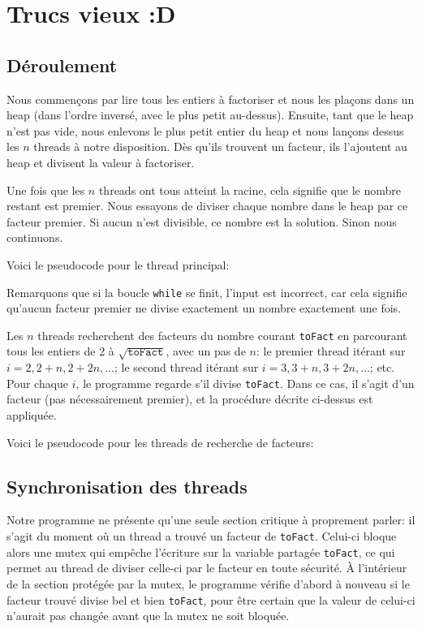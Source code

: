 \documentclass[a4paper,10pt]{article}
\begin{document}
\newpage
\section*{Trucs vieux :D}

\subsection*{Déroulement}

Nous commençons par lire tous les entiers à factoriser et nous les plaçons dans un heap (dans l'ordre inversé, avec le plus petit au-dessus). Ensuite, tant que le heap n'est pas vide, nous enlevons le plus petit entier du heap et nous lançons dessus les $n$ threads à notre disposition. Dès qu'ils trouvent un facteur, ils l'ajoutent au heap et divisent la valeur à factoriser.

Une fois que les $n$ threads ont tous atteint la racine, cela signifie que le nombre restant est premier. Nous essayons de diviser chaque nombre dans le heap par ce facteur premier. Si aucun n'est divisible, ce nombre est la solution. Sinon nous continuons.

Voici le pseudocode pour le thread principal:



Remarquons que si la boucle \texttt{while} se finit, l'input est incorrect, car cela signifie qu'aucun facteur premier ne divise exactement un nombre exactement une fois.

Les $n$ threads recherchent des facteurs du nombre courant \texttt{toFact} en parcourant tous les entiers de 2 à $\sqrt{\texttt{toFact}}$, avec un pas de $n$: le premier thread itérant sur $i=2,2+n,2+2n,\dots$; le second thread itérant sur $i=3,3+n,3+2n,\dots$; etc. Pour chaque $i$, le programme regarde s'il divise \texttt{toFact}. Dans ce cas, il s'agit d'un facteur (pas nécessairement premier), et la procédure décrite ci-dessus est appliquée.

Voici le pseudocode pour les threads de recherche de facteurs:



\subsection*{Synchronisation des threads}

Notre programme ne présente qu'une seule section critique à proprement parler: il s'agit du moment où un thread a trouvé un facteur de \texttt{toFact}. Celui-ci bloque alors une mutex qui empêche l'écriture sur la variable partagée \texttt{toFact}, ce qui permet au thread de diviser celle-ci par le facteur en toute sécurité. À l'intérieur de la section protégée par la mutex, le programme vérifie d'abord à nouveau si le facteur trouvé divise bel et bien \texttt{toFact}, pour être certain que la valeur de celui-ci n'aurait pas changée avant que la mutex ne soit bloquée.
\end{document}
